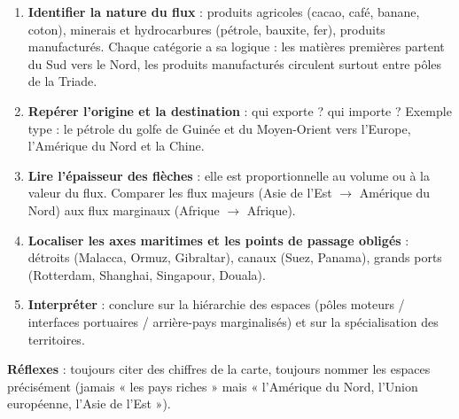 \documentclass[11pt]{article}
\begin{document}
\begin{methode}
\begin{enumerate}
\item \textbf{Identifier la nature du flux} : produits agricoles (cacao, café, banane, coton), minerais et hydrocarbures (pétrole, bauxite, fer), produits manufacturés. Chaque catégorie a sa logique : les matières premières partent du Sud vers le Nord, les produits manufacturés circulent surtout entre pôles de la Triade.
\item \textbf{Repérer l'origine et la destination} : qui exporte ? qui importe ? Exemple type : le pétrole du golfe de Guinée et du Moyen-Orient vers l'Europe, l'Amérique du Nord et la Chine.
\item \textbf{Lire l'épaisseur des flèches} : elle est proportionnelle au volume ou à la valeur du flux. Comparer les flux majeurs (Asie de l'Est $\rightarrow$ Amérique du Nord) aux flux marginaux (Afrique $\rightarrow$ Afrique).
\item \textbf{Localiser les axes maritimes et les points de passage obligés} : détroits (Malacca, Ormuz, Gibraltar), canaux (Suez, Panama), grands ports (Rotterdam, Shanghai, Singapour, Douala).
\item \textbf{Interpréter} : conclure sur la hiérarchie des espaces (pôles moteurs / interfaces portuaires / arrière-pays marginalisés) et sur la spécialisation des territoires.
\end{enumerate}
\textbf{Réflexes} : toujours citer des chiffres de la carte, toujours nommer les espaces précisément (jamais « les pays riches » mais « l'Amérique du Nord, l'Union européenne, l'Asie de l'Est »).
\end{methode}
\end{document}
